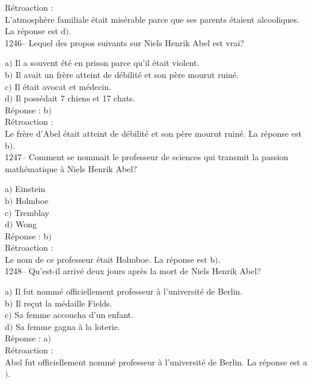 ﻿\documentclass[letterpaper, 12pt]{article}
\begin{document}
R\'etroaction : \\
L'atmosph\`ere familiale \'etait mis\'erable parce que ses parents
\'etaient alcooliques.
La r\'eponse est d$)$.\\

1246-- Lequel des propos suivants sur Niels Henrik Abel est vrai?

a$)$ Il a souvent \'et\'e en prison parce qu'il \'etait violent. \\
b$)$ Il avait un fr\`ere atteint de d\'ebilit\'e et son p\`ere mourut
ruin\'e. \\
c$)$ Il \'etait avocat et m\'edecin. \\
d$)$ Il poss\'edait 7 chiens et 17 chats.  \\

R\'eponse : b$)$\\

R\'etroaction : \\
Le fr\`ere d'Abel \'etait atteint de d\'ebilit\'e et son p\`ere
mourut ruin\'e.
La r\'eponse est b$)$.\\

1247-- Comment se nommait le professeur de sciences qui transmit la
passion math\'ematique \`a Niels Henrik Abel?

a$)$ Einstein \\
b$)$ Holmboe \\
c$)$ Tremblay \\
d$)$ Wong\\

R\'eponse : b$)$\\

R\'etroaction : \\
Le nom de ce professeur \'etait Holmboe.
La r\'eponse est b$)$.\\

1248-- Qu'est-il arriv\'e deux jours apr\`es la mort de Niels Henrik
Abel?

a$)$ Il fut nomm\'e officiellement professeur \`a l'universit\'e de Berlin.
\\
b$)$ Il re\c cut la m\'edaille Fields. \\
c$)$ Sa femme accoucha d'un enfant. \\
d$)$ Sa femme gagna \`a la loterie.\\

R\'eponse : a$)$\\

R\'etroaction : \\
Abel fut officiellement nomm\'e professeur \`a l'universit\'e de
Berlin.
La r\'eponse est a$)$.\\
\end{document}
